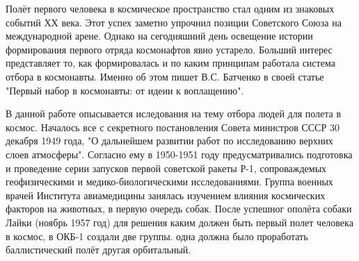 
\title{}
\author{max-wn}
\date{April 12, 1961}



\maketitle
\newpage

\large{Полёт первого человека в космическое пространство стал одним из знаковых событий ХХ века. Этот успех заметно упрочнил позиции Советского Союза на международной арене. Однако на сегодняшний день освещение истории формирования первого отряда космонафтов явно устарело. Больший интерес представляет то, как формировалась и по каким принципам работала система отбора в космонавты. Именно об этом пишет В.С. Батченко в своей статье "Первый набор в космонавты: от идеии к воплащению".}


В данной работе опысывается иследования на тему отбора людей для полета в космос. Началось все с секретного постановления Совета министров СССР 30 декабря 1949 года, "О дальнейшем развитии работ по исследованию верхних слоев атмосферы". Согласно ему в 1950-1951 году предусматривались подготовка и проведение серии запусков первой советской ракеты Р-1, сопроваждемых геофизическими и медико-биологическими исследованиями. Группа военных врачей Института авиамедицины занялась изучением влияния космических факторов на животных, в первую очередь собак. После успешног ополёта собаки Лайки (ноябрь 1957 год) для решения каким должен быть первый полет человека в космос, в ОКБ-1 создали две группы. одна должна было проработать баллистический полёт другая орбитальный.



